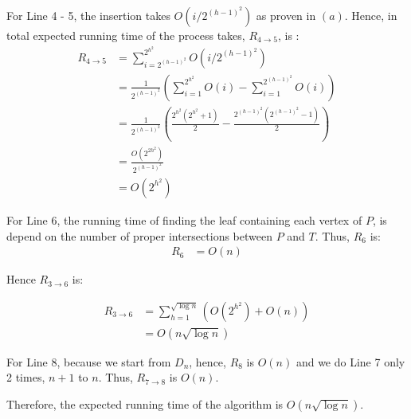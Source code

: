 For Line 4 - 5, the insertion takes $O(i/2^{(h-1)^2})$ as proven in $(a)$. Hence, in total
expected running time of the process takes, $R_{4\rightarrow5}$, is :
\begin{align*}
R_{4\rightarrow5} &= \sum_{i=2^{(h-1)^2}}^{2^{h^2}}O(i/2^{(h-1)^2}) \\
&= \frac{1}{2^{(h-1)^2}} ( \sum_{i=1}^{2^{h^2}}O(i) - \sum_{i=1}^{2^{(h-1)^2}}O(i) ) \\
&= \frac{1}{2^{(h-1)^2}} ( \frac{2^{h^2}(2^{h^2} + 1)}{2} - \frac{2^{(h-1)^2}(2^{(h-1)^2} - 1)}{2} ) \\
&= \frac{O(2^{2h^2})}{2^{(h-1)^2}} \\
&= O(2^{h^2})
\end{align*}

For Line 6, the running time of finding the leaf containing each vertex of $P$, is depend
on the number of proper intersections between $P$ and $T$. Thus, $R_{6}$ is:
\begin{align*}
    R_6 &= O(n)
\end{align*}

Hence $R_{3\rightarrow6}$ is:

\begin{align*}
    R_{3\rightarrow6} &= \sum_{h=1}^{\sqrt{\log{n}}}( O(2^{h^2}) + O(n) ) \\
    &= O(n\sqrt{\log{n}})
\end{align*}

For Line 8, because we start from $D_{n}$, hence, $R_{8}$ is $O(n)$ and we do Line 7 only
2 times, $n+1$ to $n$. Thus, $R_{7\rightarrow8}$ is $O(n)$.

Therefore, the expected running time of the algorithm is $O(n\sqrt{\log{n}})$.
